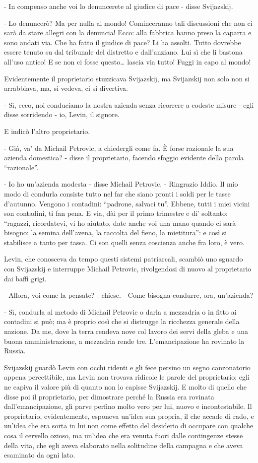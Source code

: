- In compenso anche voi lo denuncerete al giudice di pace - disse Svijazskij. 

- Lo denuncerò? Ma per nulla al mondo! Cominceranno tali discussioni che non ci sarà da stare allegri con la denuncia! Ecco: alla fabbrica hanno preso la caparra e sono andati via. Che ha fatto il giudice di pace? Li ha assolti. Tutto dovrebbe essere tenuto su dal tribunale del distretto e dall'anziano. Lui sì che li bastona all'uso antico! E se non ci fosse questo\ldots{} lascia via tutto! Fuggi in capo al mondo! 

Evidentemente il proprietario stuzzicava Svijazskij, ma Svijazskij non solo non si arrabbiava, ma, si vedeva, ci si divertiva. 

- Sì, ecco, noi conduciamo la nostra azienda senza ricorrere a codeste misure - egli disse sorridendo - io, Levin, il signore. 

E indicò l'altro proprietario. 

- Già, va' da Michail Petrovic, a chiedergli come fa. È forse razionale la sua azienda domestica? - disse il proprietario, facendo sfoggio evidente della parola ``razionale''. 

- Io ho un'azienda modesta - disse Michail Petrovic. - Ringrazio Iddio. Il mio modo di condurla consiste tutto nel far che siano pronti i soldi per le tasse d'autunno. Vengono i contadini: ``padrone, salvaci tu''. Ebbene, tutti i miei vicini son contadini, ti fan pena. E via, dài per il primo trimestre e di' soltanto: ``ragazzi, ricordatevi, vi ho aiutato, date anche voi una mano quando ci sarà bisogno: la semina dell'avena, la raccolta del fieno, la mietitura'': e così si stabilisce a tanto per tassa. Ci son quelli senza coscienza anche fra loro, è vero. 

Levin, che conosceva da tempo questi sistemi patriarcali, scambiò uno sguardo con Svijazskij e interruppe Michail Petrovic, rivolgendosi di nuovo al proprietario dai baffi grigi. 
\enlargethispage*{1\baselineskip}

- Allora, voi come la pensate? - chiese. - Come bisogna condurre, ora, un'azienda? 

- Sì, condurla al metodo di Michail Petrovic o darla a mezzadria o in fitto ai contadini si può; ma è proprio così che si distrugge la ricchezza generale della nazione. Da me, dove la terra rendeva nove col lavoro dei servi della gleba e una buona amministrazione, a mezzadria rende tre. L'emancipazione ha rovinato la Russia. 

Svijazskij guardò Levin con occhi ridenti e gli fece persino un segno canzonatorio appena percettibile, ma Levin non trovava ridicole le parole del proprietario; egli ne capiva il valore più di quanto non lo capisse Svijazskij. E molto di quello che disse poi il proprietario, per dimostrare perché la Russia era rovinata dall'emancipazione, gli parve perfino molto vero per lui, nuovo e incontestabile. Il proprietario, evidentemente, esponeva un'idea sua propria, il che accade di rado, e un'idea che era sorta in lui non come effetto del desiderio di occupare con qualche cosa il cervello ozioso, ma un'idea che era venuta fuori dalle contingenze stesse della vita, che egli aveva elaborato nella solitudine della campagna e che aveva esaminato da ogni lato. 

